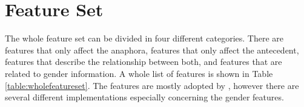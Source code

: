 
\section{Feature Set}
The whole feature set can be divided in four different categories. There are features that only affect the anaphora, features that only affect the antecedent, features that describe the relationship between both, and features that are related to gender information. A whole list of features is shown in Table \ref{table:wholefeatureset}. The features are mostly adopted by \cite{bergsma2005automatic}, however there are several different implementations especially concerning the gender features.

\begin{table}[p]
\centering
  \caption{Pronoun resolution feature set}
\end{table}
